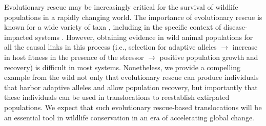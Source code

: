\documentclass[9pt,twocolumn,twoside,lineno]{pnas-new}
\begin{document}
Evolutionary rescue may be increasingly critical for the survival of
wildlife populations in a rapidly changing world. The importance of
evolutionary rescue is known for a wide variety of taxa
\citep[e.g.,][]{carlson2014, mills2018, oziolor2019}, including in the
specific context of disease-impacted systems \citep{searle2020}.
However, obtaining evidence in wild animal populations for all the
causal links in this process (i.e., selection for adaptive alleles
\(\rightarrow\) increase in host fitness in the presence of the stressor
\(\rightarrow\) positive population growth and recovery) is difficult in
most systems. Nonetheless, we provide a compelling example from the wild
not only that evolutionary rescue can produce individuals that harbor
adaptive alleles and allow population recovery, but importantly that
these individuals can be used in translocations to reestablish
extirpated populations. We expect that such evolutionary rescue-based
translocations will be an essential tool in wildlife conservation in an
era of accelerating global change.
\end{document}
